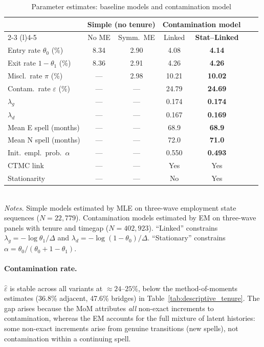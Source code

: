 \begin{table}[H]
\centering
\caption{Parameter estimates: baseline models and contamination model}
\label{tab:eps_estimates}
\footnotesize
\begin{tabular}{@{}l cc cccc@{}}
\toprule
& \multicolumn{2}{c}{Simple (no tenure)} & \multicolumn{2}{c}{Contamination model} \\
\cmidrule(lr){2-3} \cmidrule(l){4-5}
& No ME & Symm.\ ME  & Linked & \textbf{Stat--Linked} \\
\midrule
Entry rate $\theta_0$ (\%) & 8.34 & 2.90 & 4.08 & \textbf{4.14} \\
Exit rate $1{-}\theta_1$ (\%) & 8.36 & 2.91 & 4.26 & \textbf{4.26} \\
Miscl.\ rate $\pi$ (\%) & --- & 2.98  & 10.21 & \textbf{10.02} \\
Contam.\ rate $\varepsilon$ (\%) & --- & ---  & 24.79 & \textbf{24.69} \\
$\lambda_g$ & --- & --- & 0.174 & \textbf{0.174} \\
$\lambda_d$ & --- & --- & 0.167 & \textbf{0.169} \\
\addlinespace
Mean E spell (months) & --- & --- & 68.9 & \textbf{68.9} \\
Mean N spell (months) & --- & ---  & 72.0 & \textbf{71.0} \\
Init.\ empl.\ prob.\ $\alpha$ & --- & ---  & 0.550 & \textbf{0.493} \\
\addlinespace
CTMC link & --- & --- & Yes & Yes \\
Stationarity & --- & ---  & No & Yes \\
\bottomrule
\end{tabular}\\[4pt]
{\footnotesize\textit{Notes.} Simple models estimated by MLE on three-wave
employment state sequences ($N=22{,}779$). Contamination models estimated
by EM on three-wave panels with tenure and timegap ($N=402{,}923$).
``Linked'' constrains $\lambda_g = -\log\theta_1/\Delta$ and
$\lambda_d = -\log(1-\theta_0)/\Delta$. ``Stationary'' constrains
$\alpha = \theta_0/(\theta_0 + 1 - \theta_1)$.}
\end{table}

\paragraph{Contamination rate.}
$\hat\varepsilon$ is stable across all variants at
$\approx 24$--$25\%$, below the method-of-moments estimates (36.8\%
adjacent, 47.6\% bridges) in Table~\ref{tab:descriptive_tenure}. The
gap arises because the MoM attributes \emph{all} non-exact increments
to contamination, whereas the EM accounts for the full mixture of latent
histories: some non-exact increments arise from genuine transitions (new
spells), not contamination within a continuing spell.

